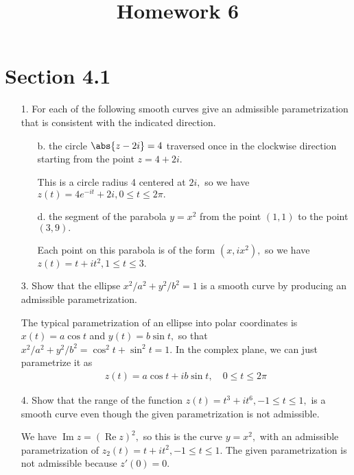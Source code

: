 \documentclass{article}
\DeclareMathOperator{\re}{Re}
\DeclareMathOperator{\im}{Im}
\begin{document}
\title{Homework 6}
\maketitle
\thispagestyle{fancy}

\section*{Section 4.1}

\begin{itemize}
	\item[1.] For each of the following smooth curves give an admissible parametrization that is consistent with the indicated direction.
		\begin{itemize}
			\item[b.] the circle $\abs{z-2i}=4$ traversed once in the clockwise direction starting from the point $z=4+2i.$
				\begin{soln}
					This is a circle radius 4 centered at $2i,$ so we have $z(t)=4e^{-it} + 2i, 0\le t\le 2\pi.$
				\end{soln}

			\item[d.] the segment of the parabola $y=x^2$ from the point $(1, 1)$ to the point $(3, 9).$
				\begin{soln}
					Each point on this parabola is of the form $(x, ix^2),$ so we have $z(t)=t + it^2, 1\le t\le 3.$
				\end{soln}

		\end{itemize}

	\item[3.] Show that the ellipse $x^2/a^2+y^2/b^2=1$ is a smooth curve by producing an admissible parametrization.
		\begin{soln}
			The typical parametrization of an ellipse into polar coordinates is $x(t)=a\cos t$ and $y(t)=b\sin t,$ so that $x^2/a^2+y^2/b^2=\cos^2t+\sin^2t=1.$ In the complex plane, we can just parametrize it as
			\begin{align*}
				z(t) = a\cos t + ib\sin t, \quad 0\le t\le 2\pi
			\end{align*}
		\end{soln}

	\item[4.] Show that the range of the function $z(t)=t^3+it^6, -1\le t\le 1,$ is a smooth curve even though the given parametrization is not admissible.
		\begin{soln}
			We have $\im z = (\re z)^2,$ so this is the curve $y=x^2,$ with an admissible parametrization of $z_2(t) = t + it^2, -1\le t\le 1.$ The given parametrization is not admissible because $z'(0)=0.$
		\end{soln}

\end{itemize}
\end{document}
